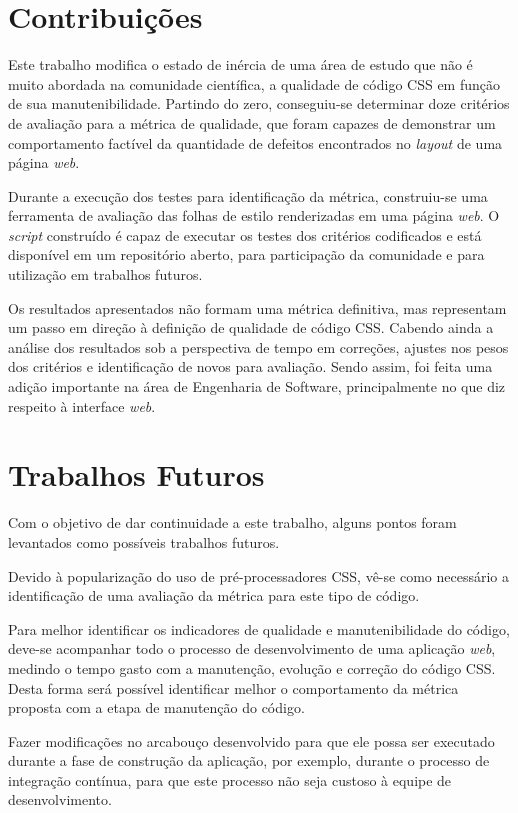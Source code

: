 \section{Contribuições}

Este trabalho modifica o estado de inércia de uma área de estudo que não é muito abordada na comunidade científica, a qualidade de código CSS em função de sua manutenibilidade. Partindo do zero, conseguiu-se determinar doze critérios de avaliação para a métrica de qualidade, que foram capazes de demonstrar um comportamento factível da quantidade de defeitos encontrados no \textit{layout} de uma página \textit{web}. 

Durante a execução dos testes para identificação da métrica, construiu-se uma ferramenta de avaliação das folhas de estilo renderizadas em uma página \textit{web}. O \textit{script} construído é capaz de executar os testes dos critérios codificados e está disponível em um repositório aberto, para participação da comunidade e para utilização em trabalhos futuros.

Os resultados apresentados não formam uma métrica definitiva, mas representam um passo em direção à definição de qualidade de código CSS. Cabendo ainda a análise dos resultados sob a perspectiva de tempo em correções, ajustes nos pesos dos critérios e identificação de novos  para avaliação. Sendo assim, foi feita uma adição importante na área de Engenharia de Software, principalmente no que diz respeito à interface \textit{web}.

\section{Trabalhos Futuros}

Com o objetivo de dar continuidade a este trabalho, alguns pontos foram levantados como possíveis trabalhos futuros.

Devido à popularização do uso de pré-processadores CSS, vê-se como necessário a identificação de uma avaliação da métrica para este tipo de código.

Para melhor identificar os indicadores de qualidade e manutenibilidade do código, deve-se acompanhar todo o processo de desenvolvimento de uma aplicação \textit{web}, medindo o tempo gasto com a manutenção, evolução e correção do código CSS. Desta forma será possível identificar melhor o comportamento da métrica proposta com a etapa de manutenção do código.

Fazer modificações no arcabouço desenvolvido para que ele possa ser executado durante a fase de construção da aplicação, por exemplo, durante o processo de integração contínua, para que este processo não seja custoso à equipe de desenvolvimento.